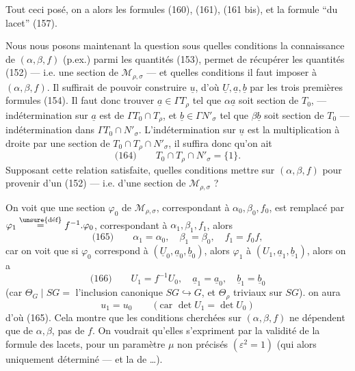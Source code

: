 
Tout ceci posé, on a alors les formules
(160), (161), (161 bis), et la formule ``du lacet'' (157).

Nous nous posons maintenant la question
sous quelles conditions la connaissance de
$(\alpha,\beta,f)$ (p.ex.) parmi les quantités (153),
permet de récupérer les quantités (152) ---
i.e. une section de $\mathcal M_{\rho,\sigma}$ --- et quelles conditions
il faut imposer à $(\alpha,\beta,f)$. Il
suffirait  de pouvoir construire $\underline u$, d'où
$\underline U,\underline a,\underline b$ par les trois premières formules
(154).  Il faut
donc trouver $\underline a\in\Gamma T_\rho$ tel que $\alpha\underline a$ soit section
de $T_0$, --- indétermination sur $\underline a$ est de
$\Gamma T_0\cap T_\rho$, et $\underline b\in\Gamma N'_\sigma$ tel que $\beta\underline b$ soit section
de $T_0$ --- indétermination dans  $\Gamma T_0\cap N'_\sigma$.
L'indétermination sur $\underline u$ est la multiplication
à droite par une section de $T_0\cap T_\rho\cap N'_\sigma$, il
suffira donc qu'on ait
\[
\text{(164)}\qquad T_0\cap T_\rho\cap N'_\sigma=\{1\}.
\]
Supposant cette relation satisfaite, quelles
conditions mettre sur $(\alpha,\beta,f)$ pour provenir
d'un  (152) --- i.e. d'une section de $\mathcal M_{\rho,\sigma}$ ?



On voit que  une section \deleted{$\unsure{\varphi}$} $\varphi_0$ de $\mathcal M_{\rho,\sigma}$, 
 correspondant à $\alpha_0,\beta_0,f_0$, est remplacé
par $\varphi_1\overset{\unsure{\text{déf}}}{=}f^{-1}.\varphi_0$, correspondant à $\alpha_1,\beta_1,f_1$, alors
\[
\text{(165)}\qquad \alpha_1=\alpha_0,\quad\beta_1=\beta_0,\quad f_1=f_0f,
\]
car on voit que si $\varphi_0$ correspond à $(\underline U_0,\underline a_0,\underline b_0)$,
alors $\varphi_1$ à $(U_1,\underline a_1,\underline b_1)$, alors on a
\[
\text{(166)}\qquad U_1=f^{-1}U_0,\quad\underline a_1=\underline a_0,\quad\underline b_1=\underline b_0
\]
(car $\Theta_G\mid SG=$ l'inclusion canonique $SG\hookrightarrow G$,
et $\Theta_\rho$\inserted{$,\Theta_\sigma$}  triviaux sur $SG$).   on aura
\[
u_1=u_0\qquad (\text{car }\det U_1=\det U_0)
\]
d'où (165). Cela montre que les conditions
cherchées sur $(\alpha,\beta,f)$ ne dépendent que de
$\alpha,\beta$, pas de $f$. On voudrait qu'elles
s'expriment par la validité de la formule des
lacets, pour un paramètre \inserted{$\varepsilon,$} $\mu$ non précisés $(\varepsilon^2=1)$
(qui  alors uniquement déterminé --- et 
la  de \ldots).

